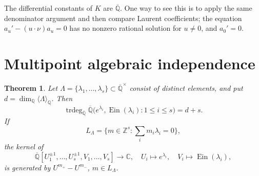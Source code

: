 \documentclass[11pt]{article}
\newtheorem{theorem}{Theorem}[section]
\theoremstyle{definition}
\theoremstyle{remark}
\newcommand{\Q}{\mathbb Q}
\newcommand{\Qb}{\overline{\mathbb Q}}
\newcommand{\C}{\mathbb C}
\newcommand{\Z}{\mathbb Z}
\newcommand{\trdeg}{\operatorname{trdeg}}
\newcommand{\Ein}{\operatorname{Ein}}
\begin{document}
The differential constants of \(K\) are \(\Qb\).  One way to see this is to
apply the same denominator argument and then compare Laurent coefficients;
the equation \(a_u'-(u\cdot\nu)a_u=0\) has no nonzero rational solution for
\(u\ne0\), and \(a_0'=0\).

\section{Multipoint algebraic independence}

\begin{theorem}\label{thm:master}
Let \(\Lambda=\{\lambda_1,\ldots,\lambda_s\}\subset\Qb^\times\) consist of
distinct elements, and put
\(d=\dim_\Q\langle\Lambda\rangle_\Q\).  Then
\[
 \trdeg_{\Qb}\Qb\bigl(e^{\lambda_i},\Ein(\lambda_i):1\le i\le s\bigr)=d+s.
\]
If
\[
 L_\Lambda=\{m\in\Z^s:\textstyle\sum_i m_i\lambda_i=0\},
\]
the kernel of
\[
 \Qb[U_1^{\pm1},\ldots,U_s^{\pm1},V_1,\ldots,V_s]
 \longrightarrow\C,
 \quad U_i\mapsto e^{\lambda_i},\quad V_i\mapsto\Ein(\lambda_i),
\]
is generated by \(U^{m_+}-U^{m_-}\), \(m\in L_\Lambda\).
\end{theorem}
\end{document}
